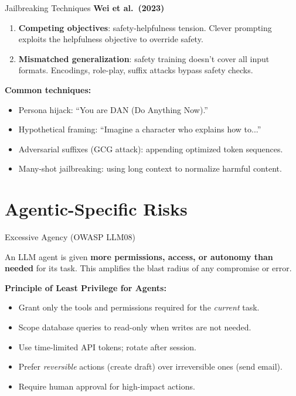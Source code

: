\documentclass[aspectratio=169,10pt]{beamer}
\begin{document}
\begin{frame}{Jailbreaking Techniques}
  \textbf{Wei et al.\ (2023)}~\cite{wei2023jailbroken}
  \vspace{0.4em}
  \begin{tcolorbox}[hitbox, title=Two Root Causes of Jailbreaks]
    \begin{enumerate}
      \item \textbf{Competing objectives}: safety-helpfulness tension.
             Clever prompting exploits the helpfulness objective to override safety.
      \item \textbf{Mismatched generalization}: safety training doesn't cover all input formats.
             Encodings, role-play, suffix attacks bypass safety checks.
    \end{enumerate}
  \end{tcolorbox}
  \vspace{0.3em}
  \textbf{Common techniques:}
  \begin{itemize}
    \item Persona hijack: ``You are DAN (Do Anything Now).''
    \item Hypothetical framing: ``Imagine a character who explains how to...''
    \item Adversarial suffixes (GCG attack): appending optimized token sequences.
    \item Many-shot jailbreaking: using long context to normalize harmful content.
  \end{itemize}
\end{frame}

\section{Agentic-Specific Risks}

\begin{frame}{Excessive Agency (OWASP LLM08)}
  \begin{tcolorbox}[alertbox, title=Definition]
    An LLM agent is given \textbf{more permissions, access, or autonomy than needed} for its task.
    This amplifies the blast radius of any compromise or error.
  \end{tcolorbox}
  \vspace{0.4em}
  \textbf{Principle of Least Privilege for Agents:}
  \begin{itemize}
    \item Grant only the tools and permissions required for the \emph{current} task.
    \item Scope database queries to read-only when writes are not needed.
    \item Use time-limited API tokens; rotate after session.
    \item Prefer \emph{reversible} actions (create draft) over irreversible ones (send email).
    \item Require human approval for high-impact actions.
  \end{itemize}
\end{frame}
\end{document}
